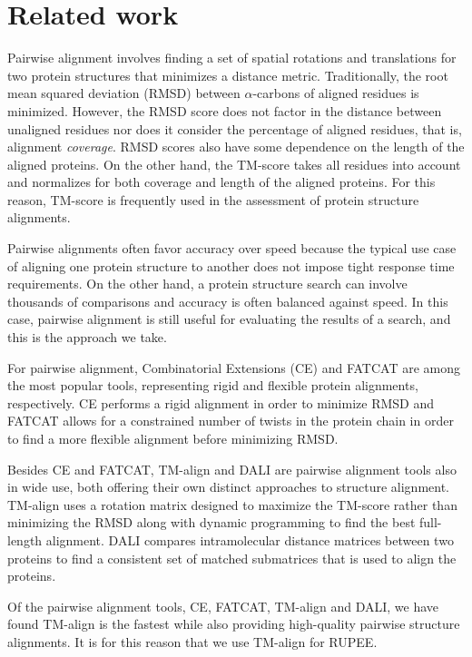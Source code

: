 \documentclass[10pt,letterpaper]{article}
\newcommand{\cas}{$\alpha$-carbons\xspace}
\begin{document}
\section*{Related work}

Pairwise alignment involves finding a set of spatial rotations and translations for two protein structures that minimizes a distance metric. 
Traditionally, the root mean squared deviation (RMSD) between \cas of aligned residues is minimized.
However, the RMSD score does not factor in the distance between unaligned residues nor does it consider the percentage of aligned residues, that is, alignment \emph{coverage}. 
RMSD scores also have some dependence on the length of the aligned proteins. 
On the other hand, the TM-score \cite{Zhang2004} takes all residues into account and normalizes for both coverage and length of the aligned proteins. 
For this reason, TM-score is frequently used in the assessment of protein structure alignments. 

Pairwise alignments often favor accuracy over speed because the typical use case of aligning one protein structure to another does not impose tight response time requirements. 
On the other hand, a protein structure search can involve thousands of comparisons and accuracy is often balanced against speed. 
In this case, pairwise alignment is still useful for evaluating the results of a search, and this is the approach we take. 

For pairwise alignment, Combinatorial Extensions (CE) \cite{Shindyalov1998} and FATCAT \cite{Ye2003} are among the most popular tools, representing rigid and flexible protein alignments, respectively. 
CE performs a rigid alignment in order to minimize RMSD and FATCAT allows for a constrained number of twists in the protein chain in order to find a more flexible alignment before minimizing RMSD.

Besides CE and FATCAT, TM-align \cite{Zhang2005} and DALI \cite{Sander1995} are pairwise alignment tools also in wide use, both offering their own distinct approaches to structure alignment. 
TM-align uses a rotation matrix designed to maximize the TM-score rather than minimizing the RMSD along with dynamic programming to find the best full-length alignment. 
DALI compares intramolecular distance matrices between two proteins to find a consistent set of matched submatrices that is used to align the proteins. 

Of the pairwise alignment tools, CE, FATCAT, TM-align and DALI, we have found TM-align is the fastest while also providing high-quality pairwise structure alignments. 
It is for this reason that we use TM-align for RUPEE.
\end{document}
